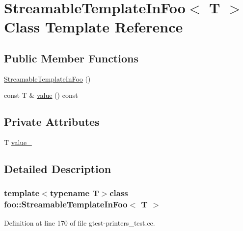\hypertarget{classfoo_1_1StreamableTemplateInFoo}{\section{\-Streamable\-Template\-In\-Foo$<$ \-T $>$ \-Class \-Template \-Reference}
\label{d8/dc1/classfoo_1_1StreamableTemplateInFoo}
}
\subsection*{\-Public \-Member \-Functions}
\begin{DoxyCompactItemize}
\item 
\hyperlink{classfoo_1_1StreamableTemplateInFoo_ababe0f74104baee51a0156cdae14c9a0}{\-Streamable\-Template\-In\-Foo} ()
\item 
const \-T \& \hyperlink{classfoo_1_1StreamableTemplateInFoo_a56e1c8bae880a4eedf8d23194eca95ca}{value} () const 
\end{DoxyCompactItemize}
\subsection*{\-Private \-Attributes}
\begin{DoxyCompactItemize}
\item 
\-T \hyperlink{classfoo_1_1StreamableTemplateInFoo_ae496c0f6edafccdab7ef2e2b9d0c7e03}{value\-\_\-}
\end{DoxyCompactItemize}


\subsection{\-Detailed \-Description}
\subsubsection*{template$<$typename \-T$>$class foo\-::\-Streamable\-Template\-In\-Foo$<$ T $>$}



\-Definition at line 170 of file gtest-\/printers\-\_\-test.\-cc.



